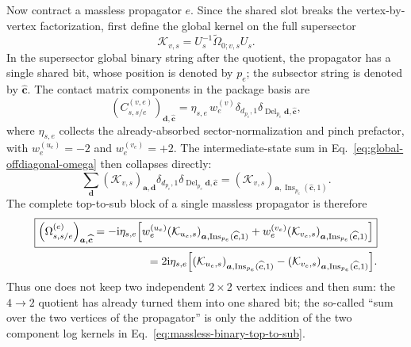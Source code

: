 \documentclass[11pt,a4paper]{article}
\newcommand{\ii}{\mathrm i}
\begin{document}
Now contract a massless propagator $e$. Since the shared slot breaks the vertex-by-vertex factorization, first define the global kernel on the full supersector
\begin{equation}
 \mathcal K_{v,s}=U_s^{-1}\widetilde\Omega_{0;v,s}U_s.
 \label{eq:global-component-log-kernel}
\end{equation}
In the supersector global binary string after the quotient, the propagator has a single shared bit, whose position is denoted by $p_e$; the subsector string is denoted by $\widehat{\bm c}$. The contact matrix components in the package basis are
\begin{equation}
 \left(C_{s,s/e}^{(v,e)}\right)_{\bm d,\widehat{\bm c}}
 =\eta_{s,e}\,w_e^{(v)}
 \delta_{d_{p_e},1}
 \delta_{\operatorname{Del}_{p_e}\bm d,\widehat{\bm c}},
 \label{eq:massless-contact-binary-component}
\end{equation}
where $\eta_{s,e}$ collects the already-absorbed sector-normalization and pinch prefactor, with $w_e^{(u_e)}=-2$ and $w_e^{(v_e)}=+2$. The intermediate-state sum in Eq.~\eqref{eq:global-offdiagonal-omega} then collapses directly:
\begin{equation}
 \sum_{\bm d}
 (\mathcal K_{v,s})_{\bm a,\bm d}
 \delta_{d_{p_e},1}
 \delta_{\operatorname{Del}_{p_e}\bm d,\widehat{\bm c}}
 =
 (\mathcal K_{v,s})_{\bm a,
 \operatorname{Ins}_{p_e}(\widehat{\bm c},1)}.
 \label{eq:massless-binary-sum-collapse}
\end{equation}
The complete top-to-sub block of a single massless propagator is therefore
\begin{align}
 \boxed{
 \left(\Omega_{s,s/e}^{(e)}\right)_{\bm a,\widehat{\bm c}}
 =-\ii\eta_{s,e}\Big[
 w_e^{(u_e)}(\mathcal K_{u_e,s})_{\bm a,\operatorname{Ins}_{p_e}(\widehat{\bm c},1)}
 +w_e^{(v_e)}(\mathcal K_{v_e,s})_{\bm a,\operatorname{Ins}_{p_e}(\widehat{\bm c},1)}
 \Big]
 }
 \notag\\
 =2\ii\eta_{s,e}\Big[
 (\mathcal K_{u_e,s})_{\bm a,\operatorname{Ins}_{p_e}(\widehat{\bm c},1)}
 -(\mathcal K_{v_e,s})_{\bm a,\operatorname{Ins}_{p_e}(\widehat{\bm c},1)}
 \Big].
 \label{eq:massless-binary-top-to-sub}
\end{align}
Thus one does not keep two independent $2\times2$ vertex indices and then sum: the $4\to2$ quotient has already turned them into one shared bit; the so-called ``sum over the two vertices of the propagator'' is only the addition of the two component log kernels in Eq.~\eqref{eq:massless-binary-top-to-sub}.
\end{document}
